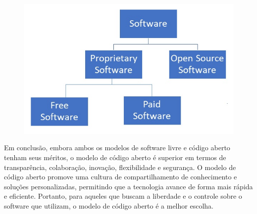 \documentclass[
	12pt,				%
	oneside,			%
	a4paper,			%
	english,			%
	brazil				%
	]{abntex2ppgsi}
\begin{document}
\begin{figure}[H]
	\centering
		\includegraphics{tree.jpg}
	\label{fig:tree}
\end{figure}

Em conclusão, embora ambos os modelos de software livre e código aberto tenham seus méritos, o modelo de código aberto é superior em termos de transparência, colaboração, inovação, flexibilidade e segurança. O modelo de código aberto promove uma cultura de compartilhamento de conhecimento e soluções personalizadas, permitindo que a tecnologia avance de forma mais rápida e eficiente. Portanto, para aqueles que buscam a liberdade e o controle sobre o software que utilizam, o modelo de código aberto é a melhor escolha.

\postextual


\end{document}
